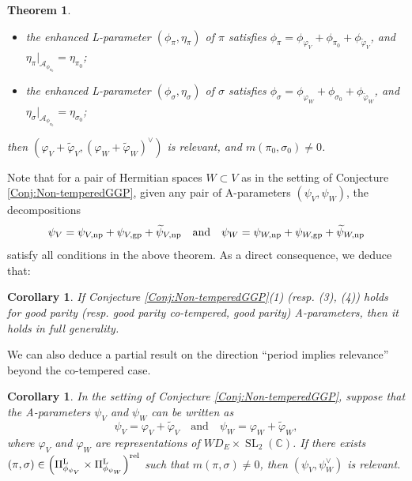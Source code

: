 \documentclass[11pt,letterpaper]{amsart}
\theoremstyle{plain}
\newcounter{theorem}[section]
\numberwithin{theorem}{section}
\numberwithin{equation}{subsection}
\newtheorem{Thm}[theorem]{Theorem}
\newtheorem{Cor}[theorem]{Corollary}
\theoremstyle{remark}
\newcommand{\SL}{\operatorname{SL}}
\newcommand{\C}{\mathbb{C}}
\def\calA{\mathcal{A}}
\def\LP{\Pi^{\rm L}} %
\def\gp{{\rm gp}} %
\def\np{{\rm np}} %
\def\rel{{\rm rel}} %
\begin{document}
\begin{Thm}
\begin{enumerate}
\begin{itemize}
        \vskip 5pt

        \item the enhanced L-parameter $\left(\phi_\pi,\eta_\pi\right)$ of $\pi$ satisfies $\phi_\pi = \phi_{\varphi_V}+\phi_{\pi_0}+\phi_{\widetilde{\varphi}_V}$, and $\eta_\pi\big|_{\calA_{\phi_{\pi_0}}}=\eta_{\pi_0}$;

        \vskip 5pt

        \item the enhanced L-parameter $\left(\phi_\sigma,\eta_\sigma\right)$ of $\sigma$ satisfies $\phi_\sigma = \phi_{\varphi_W}+\phi_{\sigma_0}+\phi_{\widetilde{\varphi}_W}$, and $\eta_\sigma\big|_{\calA_{\phi_{\sigma_0}}}=\eta_{\sigma_0}$;
    \end{itemize}
    then $\left(\varphi_V + \widetilde{\varphi}_V,\left(\varphi_W + \widetilde{\varphi}_W\right)^\vee\right)$ is relevant, and $m\left(\pi_0,\sigma_0\right)\neq0$.
\end{enumerate}
\end{Thm}

\vskip 5pt

Note that for a pair of Hermitian spaces $W\subset V$ as in the setting of Conjecture \ref{Conj:Non-temperedGGP}, given any pair of A-parameters $\left(\psi_V,\psi_W\right)$, the decompositions 
\[
    \psi_V = \psi_{V,\np} + \psi_{V,\gp} + \widetilde{\psi}_{V,\np} \quad \text{and} \quad \psi_W = \psi_{W,\np} + \psi_{W,\gp} + \widetilde{\psi}_{W,\np} 
\]
satisfy all conditions in the above theorem. As a direct consequence, we deduce that:
\begin{Cor}
If Conjecture \ref{Conj:Non-temperedGGP}(1) (resp. (3), (4)) holds for good parity (resp. good parity co-tempered, good parity) A-parameters, then it holds in full generality.  
\end{Cor}

\vskip 5pt

We can also deduce a partial result on the direction ``period implies relevance'' beyond the co-tempered case.

\begin{Cor}\label{C:PeriodImpliesRelevanceEvenParameter}
In the setting of Conjecture \ref{Conj:Non-temperedGGP}, suppose that the A-parameters $\psi_V$ and $\psi_W$ can be written as
\[
    \psi_V = \varphi_V + \widetilde{\varphi}_V \quad \text{and} \quad \psi_W = \varphi_W + \widetilde{\varphi}_{W},
\] 
where $\varphi_V$ and $\varphi_W$ are representations of $WD_E\times \SL_2(\C)$. If there exists $\left(\pi,\sigma\right)\in\left(\LP_{\phi_{\psi_V}}\times \LP_{\phi_{\psi_W}}\right)^\rel$ such that $m\left(\pi,\sigma\right)\neq 0$, then $\left(\psi_{V},\psi_{W}^\vee\right)$ is relevant.
\end{Cor}
\end{document}
